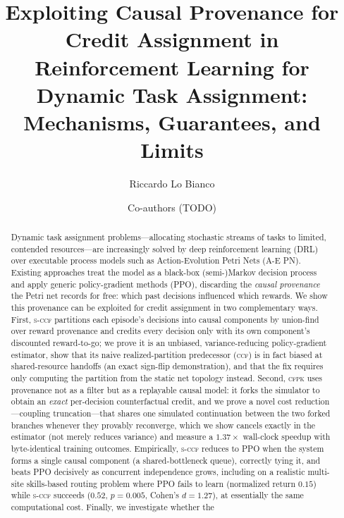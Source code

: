 \documentclass[review,authoryear,3p,times]{elsarticle}
\newcommand{\ccf}{\textsc{ccf}}
\newcommand{\sccf}{\textsc{s-ccf}}
\newcommand{\cfpk}{\textsc{cfpk}}
\begin{document}
\begin{frontmatter}

\title{Exploiting Causal Provenance for Credit Assignment in Reinforcement
Learning for Dynamic Task Assignment: Mechanisms, Guarantees, and Limits}

\author[tue]{Riccardo Lo Bianco}
\author[tue]{Co-authors \textnormal{(TODO)}}
\address[tue]{Eindhoven University of Technology, Eindhoven, The Netherlands}

\begin{abstract}
Dynamic task assignment problems---allocating stochastic streams of tasks to
limited, contended resources---are increasingly solved by deep reinforcement
learning (DRL) over executable process models such as Action-Evolution Petri
Nets (A-E PN). Existing approaches treat the model as a black-box (semi-)Markov
decision process and apply generic policy-gradient methods (PPO), discarding the
\emph{causal provenance} the Petri net records for free: which past decisions
influenced which rewards. We show this provenance can be exploited for credit
assignment in two complementary ways. First, \sccf{} partitions each episode's
decisions into causal components by union-find over reward provenance and
credits every decision only with its own component's discounted reward-to-go;
we prove it is an unbiased, variance-reducing policy-gradient estimator, show
that its naive realized-partition predecessor (\ccf) is in fact biased at
shared-resource handoffs (an exact sign-flip demonstration), and that the fix
requires only computing the partition from the static net topology instead.
Second, \cfpk{} uses provenance not as a filter but as a replayable causal
model: it forks the simulator to obtain an \emph{exact} per-decision
counterfactual credit, and we prove a novel cost reduction---coupling
truncation---that shares one simulated continuation between the two forked
branches whenever they provably reconverge, which we show cancels exactly in
the estimator (not merely reduces variance) and measure a $1.37\times$
wall-clock speedup with byte-identical training outcomes. Empirically, \sccf{}
reduces to PPO when the system forms a single causal component (a
shared-bottleneck queue), correctly tying it, and beats PPO decisively as
concurrent independence grows, including on a realistic multi-site
skills-based routing problem where PPO fails to learn (normalized return
$0.15$) while \sccf{} succeeds ($0.52$, $p=0.005$, Cohen's $d=1.27$), at
essentially the same computational cost. Finally, we investigate whether the

\end{abstract}
\end{frontmatter}
\end{document}
